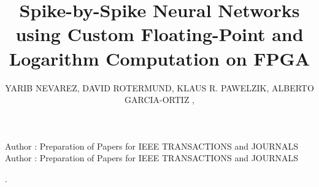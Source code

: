 \title {Spike-by-Spike Neural Networks using Custom Floating-Point and Logarithm Computation on FPGA}

\author{
	\uppercase{Yarib Nevarez},	
	\uppercase{David Rotermund},
	\uppercase{Klaus R. Pawelzik},
	\uppercase{Alberto Garcia-Ortiz} ,
}

\address[1]{Institute of Electrodynamics and Microelectronics, University of Bremen, Bremen 28359, Germany (e-mail: nevarez@item.uni-bremen.de)}

\address[2]{Institute for Theoretical Physics, University of Bremen, Bremen 28359, Germany (e-mail: davrot@@neuro.uni-bremen.de)}

\address[3]{Institute for Theoretical Physics, University of Bremen, Bremen 28359, Germany (e-mail: pawelzik@@neuro.uni-bremen.de)}

\address[4]{Institute of Electrodynamics and Microelectronics, University of Bremen, Bremen 28359, Germany (e-mail: agaracia@item.uni-bremen.de)}


\markboth
{Author \headeretal: Preparation of Papers for IEEE TRANSACTIONS and JOURNALS}
{Author \headeretal: Preparation of Papers for IEEE TRANSACTIONS and JOURNALS}

.

